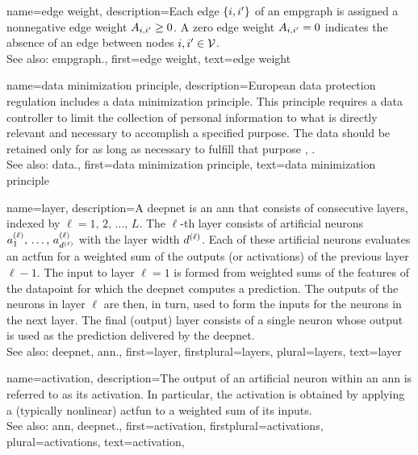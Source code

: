 {name={edge weight},
	description={Each edge $\{i,i'\}$ of an \gls{empgraph} is 
		assigned a nonnegative edge weight $A_{i,i'}\geq0$. 
		A zero edge weight $A_{i,i'}=0$ indicates the absence 
		of an edge between nodes $i, i' \in \mathcal{V}$.
				\\
		See also: \gls{empgraph}.}, 
	first={edge weight},
	text={edge weight}
}


{name={data minimization principle},
	description={European \gls{data} protection regulation 
		includes a \gls{data} minimization principle. This principle requires a \gls{data} controller to 
		limit the collection of personal information to what is directly relevant and necessary 
		to accomplish a specified purpose. The \gls{data} should be retained only for as long as 
		necessary to fulfill that purpose \cite[Article 5(1)(c)]{GDPR2016}, \cite{EURegulation2018}.
				\\
		See also: \gls{data}.}, 
	first={data minimization principle},
	text={data minimization principle}
}

{name={layer},
	description={A \gls{deepnet} is an \gls{ann} that consists of consecutive layers, indexed by $\ell=1,\,2,\,\ldots,\,L$. 
		The $\ell$-th layer consists of artificial neurons $a^{(\ell)}_{1},\,\ldots,\,a^{(\ell)}_{d^{(\ell)}}$ with 
		the layer width $d^{(\ell)}$. Each of these artificial neurons evaluates an \gls{actfun} for 
		a weighted sum of the outputs (or \glspl{activation}) of the previous layer $\ell-1$. The input to layer $\ell=1$ 
	    	is formed from weighted sums of the \glspl{feature} of the \gls{datapoint} for which the \gls{deepnet} 
	    	computes a \gls{prediction}. The outputs of the neurons in layer $\ell$ are then, in turn, used to form 
	    	the inputs for the neurons in the next layer. The final (output) layer consists of a single neuron whose 
		output is used as the \gls{prediction} delivered by the \gls{deepnet}.  
		\\
		See also: \gls{deepnet}, \gls{ann}.}, 
	first={layer},
	firstplural={layers},
	plural={layers}, 
	text={layer}
}


{name={activation},
	description={The output  of an artificial neuron within an \gls{ann} is referred 
		to as its activation. In particular, the activation is obtained by applying a (typically nonlinear) \gls{actfun} 
		to a weighted sum of its inputs.
		\\
		See also: \gls{ann}, \gls{deepnet}.}, 
	first={activation},
	firstplural={activations},
	plural={activations}, 
	text={activation}, 
}

